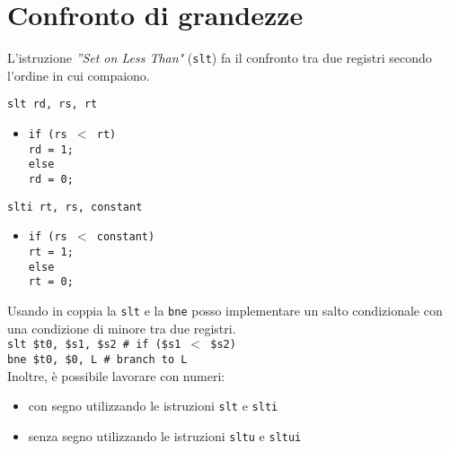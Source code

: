 \documentclass[../main.tex]{subfiles}
\begin{document}
\newpage

\section{Confronto di grandezze}
L'istruzione \textit{''Set on Less Than"} (\texttt{slt}) fa il confronto
tra due registri secondo l'ordine in cui compaiono.

\vspace*{-2mm}

\begin{table}[h!]
    \begin{minipage}{.5\linewidth}
        \texttt{slt rd, rs, rt}
        \begin{itemize}
            \item \texttt{if (rs $<$ rt) \\
            \hspace*{0cm} \hspace*{0cm} rd = 1; \\
            else \\
            \hspace*{0cm} \hspace*{0cm} rd = 0;}
        \end{itemize}
    \end{minipage}
    \begin{minipage}{.5\linewidth}
        \texttt{slti rt, rs, constant}
        \begin{itemize}
            \item \texttt{if (rs $<$ constant) \\
            \hspace*{0cm} \hspace*{0cm}  rt = 1; \\
            else \\
            \hspace*{0cm} \hspace*{0cm} rt = 0;}
        \end{itemize}
    \end{minipage}
\end{table}

\noindent
Usando in coppia la \texttt{slt} e la \texttt{bne} posso implementare
un salto condizionale con una condizione di minore tra due registri.
\\[2mm]
\texttt{slt \$t0, \$s1, \$s2 \# if (\$s1 $<$ \$s2)} \\
\texttt{bne \$t0, \$0, L \hspace*{0cm} \hspace*{0cm} \hspace*{0cm} \# \hspace*{0cm} \hspace*{0cm} branch to L}
\\[2mm]
Inoltre, è possibile lavorare con numeri:
\begin{itemize}
    \item con segno utilizzando le istruzioni \texttt{slt} e \texttt{slti}
    \item senza segno utilizzando le istruzioni \texttt{sltu} e \texttt{sltui}
\end{itemize}
\end{document}
